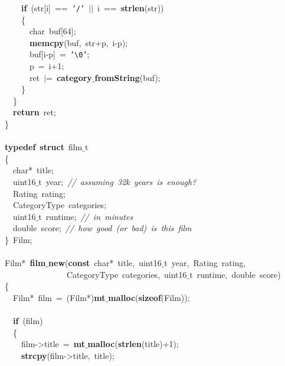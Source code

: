 \documentclass{article}
\begin{document}
\mbox{}\ \ \ \ \textbf{if}\ (str[i]\ ==\ \texttt{'/'}\ $|$$|$\ i\ ==\ \textbf{strlen}(str)) \\
\mbox{}\ \ \ \ \{ \\
\mbox{}\ \ \ \ \ \ char\ buf[64]; \\
\mbox{}\ \ \ \ \ \ \textbf{memcpy}(buf,\ str+p,\ i-p); \\
\mbox{}\ \ \ \ \ \ buf[i-p]\ =\ \texttt{'}\texttt{\textbackslash{}0}\texttt{'}; \\
\mbox{}\ \ \ \ \ \ p\ =\ i+1; \\
\mbox{}\ \ \ \ \ \ ret\ $|$=\ \textbf{category$\_$fromString}(buf); \\
\mbox{}\ \ \ \ \} \\
\mbox{}\ \ \} \\
\mbox{}\ \ \textbf{return}\ ret; \\
\mbox{}\} \\
\mbox{} \\
\mbox{}\textbf{typedef}\ \textbf{struct}\ film$\_$t \\
\mbox{}\{ \\
\mbox{}\ \ char*\ title; \\
\mbox{}\ \ uint16$\_$t\ year;\ \textit{//\ assuming\ 32k\ years\ is\ enough?} \\
\mbox{}\ \ Rating\ rating; \\
\mbox{}\ \ CategoryType\ categories; \\
\mbox{}\ \ uint16$\_$t\ runtime;\ \textit{//\ in\ minutes} \\
\mbox{}\ \ double\ score;\ \textit{//\ how\ good\ (or\ bad)\ is\ this\ film} \\
\mbox{}\}\ Film; \\
\mbox{} \\
\mbox{}Film*\ \textbf{film$\_$new}(\textbf{const}\ char*\ title,\ uint16$\_$t\ year,\ Rating\ rating, \\
\mbox{}\ \ \ \ \ \ \ \ \ \ \ \ \ \ \ CategoryType\ categories,\ uint16$\_$t\ runtime,\ double\ score) \\
\mbox{}\{ \\
\mbox{}\ \ Film*\ film\ =\ (Film*)\textbf{mt$\_$malloc}(\textbf{sizeof}(Film)); \\
\mbox{} \\
\mbox{}\ \ \textbf{if}\ (film) \\
\mbox{}\ \ \{ \\
\mbox{}\ \ \ \ film-\textgreater{}title\ =\ \textbf{mt$\_$malloc}(\textbf{strlen}(title)+1); \\
\mbox{}\ \ \ \ \textbf{strcpy}(film-\textgreater{}title,\ title); \\
$$
\end{document}
